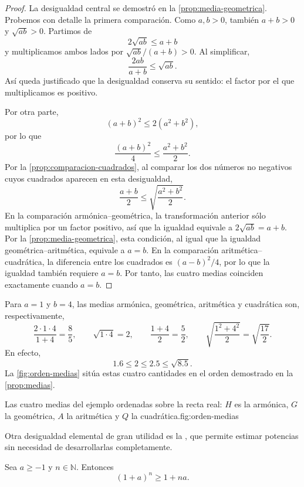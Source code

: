\begin{proof}
La desigualdad central se demostró en la \cref{prop:media-geometrica}. Probemos con detalle la primera comparación. Como $a,b>0$, también $a+b>0$ y $\sqrt{ab}>0$. Partimos de
\[
2\sqrt{ab}\leq a+b
\]
y multiplicamos ambos lados por $\sqrt{ab}/(a+b)>0$. Al simplificar,
\[
\frac{2ab}{a+b}\leq\sqrt{ab}.
\]
Así queda justificado que la desigualdad conserva su sentido: el factor por el que multiplicamos es positivo.

Por otra parte,
\[
(a+b)^2\leq2(a^2+b^2),
\]
por lo que
\[
\frac{(a+b)^2}{4}\leq\frac{a^2+b^2}{2}.
\]
Por la \cref{prop:comparacion-cuadrados}, al comparar los dos números no negativos cuyos cuadrados aparecen en esta desigualdad,
\[
\frac{a+b}{2}\leq\sqrt{\frac{a^2+b^2}{2}}.
\]
En la comparación armónica--geométrica, la transformación anterior sólo multiplica por un factor positivo, así que la igualdad equivale a $2\sqrt{ab}=a+b$. Por la \cref{prop:media-geometrica}, esta condición, al igual que la igualdad geométrica--aritmética, equivale a $a=b$. En la comparación aritmética--cuadrática, la diferencia entre los cuadrados es $(a-b)^2/4$, por lo que la igualdad también requiere $a=b$. Por tanto, las cuatro medias coinciden exactamente cuando $a=b$.
\end{proof}

\begin{example}
Para $a=1$ y $b=4$, las medias armónica, geométrica, aritmética y cuadrática son, respectivamente,
\[
\frac{2\cdot1\cdot4}{1+4}=\frac85,
\qquad
\sqrt{1\cdot4}=2,
\qquad
\frac{1+4}{2}=\frac52,
\qquad
\sqrt{\frac{1^2+4^2}{2}}=\sqrt{\frac{17}{2}}.
\]
En efecto,
\[
1.6\leq2\leq2.5\leq\sqrt{8.5}.
\]
La \cref{fig:orden-medias} sitúa estas cuatro cantidades en el orden demostrado en la \cref{prop:medias}.
\end{example}

\begin{figuranotas}{Las cuatro medias del ejemplo ordenadas sobre la recta real: $H$ es la armónica, $G$ la geométrica, $A$ la aritmética y $Q$ la cuadrática.}{fig:orden-medias}

\end{figuranotas}

Otra desigualdad elemental de gran utilidad es la , que permite estimar potencias sin necesidad de desarrollarlas completamente.

\begin{samepage}
\begin{proposition}
\label{prop:bernoulli}
Sea $a\geq-1$ y $n\in\mathbb{N}$. Entonces
\[
(1+a)^n\geq1+na.
\]
\end{proposition}
\end{samepage}

